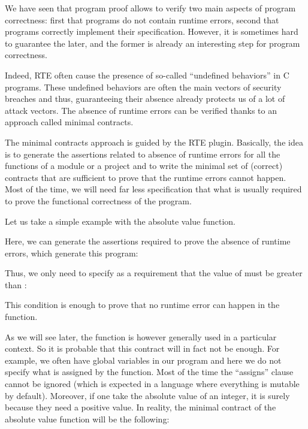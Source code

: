 We have seen that program proof allows to verify two main aspects of program
correctness: first that programs do not contain runtime errors, second that
programs correctly implement their specification. However, it is sometimes hard
to guarantee the later, and the former is already an interesting step for
program correctness.

Indeed, RTE often cause the presence of so-called ``undefined behaviors'' in C
programs. These undefined behaviors are often the main vectors of security
breaches and thus, guaranteeing their absence already protects us of a lot of
attack vectors. The absence of runtime errors can be verified thanks to an
approach called minimal contracts.




The minimal contracts approach is guided by the RTE plugin. Basically, the idea
is to generate the assertions related to absence of runtime errors for all the
functions of a module or a project and to write the minimal set of (correct)
contracts that are sufficient to prove that the runtime errors cannot happen.
Most of the time, we will need far less specification that what is usually
required to prove the functional correctness of the program.


Let us take a simple example with the absolute value function.




Here, we can generate the assertions required to prove the absence of runtime
errors, which generate this program:




Thus, we only need to specify as a requirement that the value of 
must be greater than :




This condition is enough to prove that no runtime error can happen in the
function.


As we will see later, the function is however generally used in a particular
context. So it is probable that this contract will in fact not be enough. For
example, we often have global variables in our program and here we do not
specify what is assigned by the function. Most of the time the ``assigns''
clause cannot be ignored (which is expected in a language where everything is
mutable by default). Moreover, if one take the absolute value of an integer,
it is surely because they need a positive value. In reality, the minimal
contract of the absolute value function will be the following:


